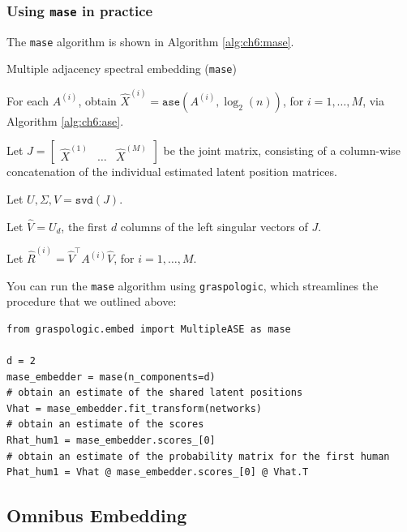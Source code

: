 \subsubsection{Using \texttt{mase} in practice}

The \texttt{mase} algorithm is shown in Algorithm \ref{alg:ch6:mase}. 

\begin{algorithm}[h]\caption{Multiple adjacency spectral embedding (\texttt{mase})}
\label{alg:ch6:mase}
\SetAlgoLined

For each $A^{(i)}$, obtain $\hat X^{(i)} = \texttt{ase}\left(A^{(i)}, \log_2(n)\right)$, for $i = 1, \hdots, M$, via Algorithm \ref{alg:ch6:ase}. 

Let $J = \begin{bmatrix}\hat X^{(1)} & \hdots & \hat X^{(M)}\end{bmatrix}$ be the joint matrix, consisting of a column-wise concatenation of the individual estimated latent position matrices.

Let $U, \Sigma, V = \texttt{svd}(J)$.

Let $\hat V = U_d$, the first $d$ columns of the left singular vectors of $J$. 

Let $\hat R^{(i)} = \hat V^\top A^{(i)}\hat V$, for $i = 1, \hdots, M$.

\end{algorithm}

You can run the \texttt{mase} algorithm using \texttt{graspologic}, which streamlines the procedure that we outlined above:

\begin{lstlisting}[style=python]
from graspologic.embed import MultipleASE as mase

d = 2
mase_embedder = mase(n_components=d)
# obtain an estimate of the shared latent positions
Vhat = mase_embedder.fit_transform(networks)
# obtain an estimate of the scores
Rhat_hum1 = mase_embedder.scores_[0]
# obtain an estimate of the probability matrix for the first human
Phat_hum1 = Vhat @ mase_embedder.scores_[0] @ Vhat.T
\end{lstlisting}

\subsection{Omnibus Embedding}
\label{sec:ch6:multinet:omni}

